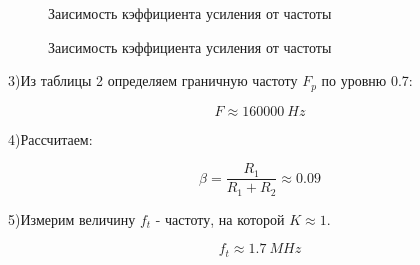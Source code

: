 \documentclass[15pt,a5paper,reqno]{article}
\begin{document}
\begin {figure}[h!]
      \caption{Заисимость кэффициента усиления от частоты}      
      \label {fig:image1}
\end {figure}

\begin {figure}[h!]
      \caption{Заисимость кэффициента усиления от частоты}      
      \label {fig:image1}
\end {figure}

3)Из таблицы 2 определяем граничную частоту $F_p$ по уровню 0.7:

\[  F \approx 160000 \: Hz     \] 

4)Рассчитаем:

\begin{equation}
    \beta = \frac{R_1}{R_1 + R_2} \approx 0.09
\end{equation}

5)Измерим величину $f_t$ - частоту, на которой $K \approx 1$.

\[  f_t \approx 1.7 \: MHz \]
\end{document}
